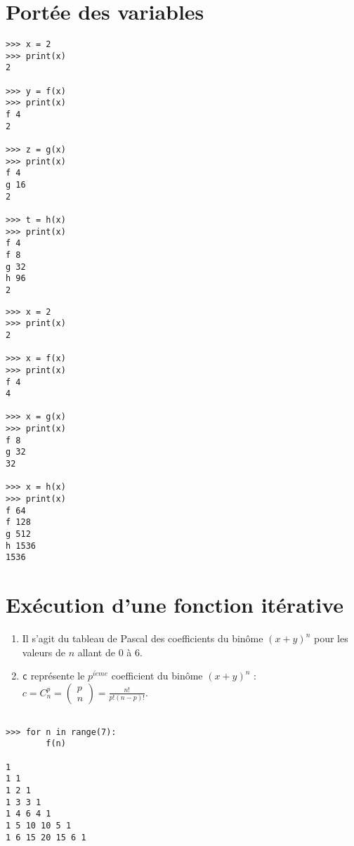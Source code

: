 \documentclass[11pt,a4paper]{article}
\begin{document}
\section{Portée des variables}
%

\begin{minipage}[t]{7cm}\footnotesize
\begin{verbatim}
>>> x = 2
>>> print(x)
2

>>> y = f(x)
>>> print(x)
f 4
2

>>> z = g(x)
>>> print(x)
f 4
g 16
2

>>> t = h(x)
>>> print(x)
f 4
f 8
g 32
h 96
2
\end{verbatim}
\end{minipage}
\hfill
\begin{minipage}[t]{7cm}\footnotesize
\begin{verbatim}
>>> x = 2
>>> print(x)
2

>>> x = f(x)
>>> print(x)
f 4
4

>>> x = g(x)
>>> print(x)
f 8
g 32
32

>>> x = h(x)
>>> print(x)
f 64
f 128
g 512
h 1536
1536
\end{verbatim}
\end{minipage}

\section{Exécution d'une fonction itérative}
%

\noindent\begin{minipage}[t]{10cm}
\begin{enumerate}
\item Il s'agit du tableau de Pascal des coefficients du binôme $(x+y)^n$
	pour les valeurs de $n$ allant de 0 à 6.
\item {\tt c} représente le $p^{i\grave eme}$ coefficient du binôme $(x+y)^n$ :
	$\displaystyle c = C_n^p = \left(\begin{array}{c}p\\n\end{array}\right) =
	\frac{n!}{p!(n-p)!}$.
\end{enumerate}
\end{minipage}
\hfill
\begin{minipage}[t]{5cm}
\begin{verbatim}

>>> for n in range(7): 
        f(n)

1 
1 1 
1 2 1 
1 3 3 1 
1 4 6 4 1 
1 5 10 10 5 1 
1 6 15 20 15 6 1 
\end{verbatim}
\end{minipage}
\label{fini}
\end{document}
